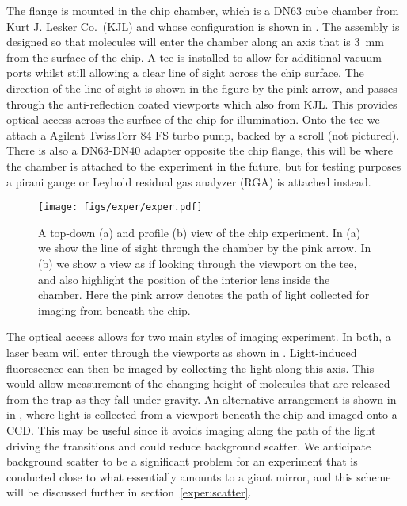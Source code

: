 The flange is mounted in the chip chamber, which is a DN63 cube chamber from
Kurt J.  Lesker Co.\ (KJL) and whose configuration is shown in
.  The assembly is designed so that molecules will
enter the chamber along an axis that is \SI{3}{\milli\meter} from the surface
of the chip. A tee is installed to allow for additional vacuum ports whilst
still allowing a clear line of sight across the chip surface. The direction of
the line of sight is shown in the figure by the pink arrow, and passes through
the anti-reflection coated viewports which also from KJL. This provides optical
access across the surface of the chip for illumination.  Onto the tee we attach
a Agilent TwissTorr 84 FS turbo pump, backed by a scroll (not pictured).  There
is also a DN63-DN40 adapter opposite the chip flange, this will be where the
chamber is attached to the \CaF{} experiment in the future, but for testing
purposes a pirani gauge or Leybold residual gas analyzer (RGA) is attached
instead.

\begin{figure}
  \centering
  \texttt{[image: figs/exper/exper.pdf]}
  \caption[Chip chamber testing setup]{
  A top-down (a) and profile (b) view of the chip experiment. In (a)
  we show the line of sight through the chamber by the pink arrow. In (b) we
  show a view as if looking through the viewport on the tee, and also highlight
  the position of the interior lens inside the chamber. Here the
  pink arrow denotes the path of light collected for imaging from beneath the
  chip.}
  \label{exper:fig:exper}
\end{figure}

The optical access allows for two main styles of imaging experiment. In both, a
laser beam will enter through the viewports as shown in
. Light-induced fluorescence can then be imaged
by collecting the light along this axis. This would allow measurement of the
changing height of molecules that are released from the trap as they fall under
gravity. 
%
An alternative arrangement is shown in in ,
where light is collected from a viewport beneath the chip and imaged onto a
CCD. This may be useful since it avoids imaging along the path of the light
driving the transitions and could reduce background scatter. We anticipate
background scatter to be a significant problem for an experiment that is
conducted close to what essentially amounts to a giant mirror, and this scheme
will be discussed further in section~\ref{exper:scatter}.

